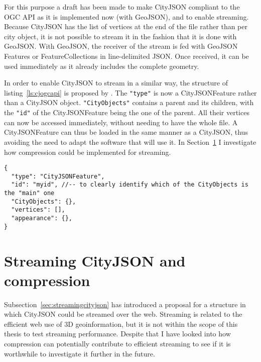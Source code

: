For this purpose a draft \citep{Ledoux2020} has been made to make CityJSON compliant to the OGC API as it is implemented now (with GeoJSON), and to enable streaming.
Because CityJSON has the list of vertices at the end of the file rather than per city object, it is not possible to stream it in the fashion that it is done with GeoJSON.
With GeoJSON, the receiver of the stream is fed with GeoJSON Features or FeatureCollections in line-delimited JSON.
Once received, it can be used immediately as it already includes the complete geometry.

In order to enable CityJSON to stream in a similar way, the structure of listing~\ref{ls:cjogcapi} is proposed by \citet{Ledoux2020}.
The \texttt{"type"} is now a CityJSONFeature rather than a CityJSON object.
\texttt{"CityObjects"} contains a parent and its children, with the \texttt{"id"} of the CityJSONFeature being the one of the parent.
All their vertices can now be accessed immediately, without needing to have the whole file.
A CityJSONFeature can thus be loaded in the same manner as a CityJSON, thus avoiding the need to adapt the software that will use it.
In Section~\ref{streamingcompression} I investigate how compression could be implemented for streaming.



\begin{lstlisting}[frame=single,style=base,caption={Snippet of OGC API compliant CityJSON structure. Source: \citet{Ledoux2020}}, label=ls:cjogcapi]
{
  "type": "CityJSONFeature",
  "id": "myid", //-- to clearly identify which of the CityObjects is the "main" one
  "CityObjects": {},
  "vertices": [],
  "appearance": {},
}
\end{lstlisting}


\section{Streaming CityJSON and compression}
\label{streamingcompression}

Subsection~\ref{sec:streamingcityjson} has introduced a proposal for a structure in which CityJSON could be streamed over the web.
Streaming is related to the efficient web use of 3D geoinformation, but it is not within the scope of this thesis to test streaming performance.
Despite that I have looked into how compression can potentially contribute to efficient streaming to see if it is worthwhile to investigate it further in the future.


